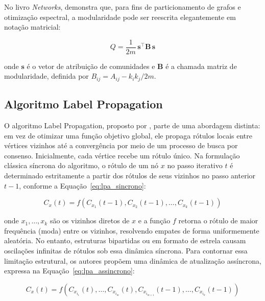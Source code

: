\documentclass[
      12pt,
      a4paper,
      openright,
      oneside,
      chapter=TITLE,
      section=TITLE,
      english,
      french,
      spanish,
      brazilian
    ]{abntex2}
\begin{document}
    No livro \textit{Networks},  demonstra que, para fins de particionamento de grafos e otimização espectral, a modularidade pode ser reescrita elegantemente em notação matricial:
    
    \begin{equation}
    Q = \frac{1}{2m}\, \mathbf{s}^{\top} \mathbf{B}\, \mathbf{s}
    \label{eq:mod_matricial}
    \end{equation}
    
    onde $\mathbf{s}$ é o vetor de atribuição de comunidades e $\mathbf{B}$ é a chamada matriz de modularidade, definida por $B_{ij} = A_{ij} - k_i k_j / 2m$.
    
    \subsection{Algoritmo Label Propagation}
    
    O algoritmo Label Propagation, proposto por , parte de uma abordagem distinta: em vez de otimizar uma função objetivo global, ele propaga rótulos locais entre vértices vizinhos até a convergência por meio de um processo de busca por consenso. Inicialmente, cada vértice recebe um rótulo único. Na formulação clássica síncrona do algoritmo, o rótulo de um nó $x$ no passo iterativo $t$ é determinado estritamente a partir dos rótulos de seus vizinhos no passo anterior $t-1$, conforme a Equação~\ref{eq:lpa_sincrono}:
    
    \begin{equation}
    C_x(t) = f\left( C_{x_1}(t-1), C_{x_2}(t-1), \dots, C_{x_k}(t-1) \right)
    \label{eq:lpa_sincrono}
    \end{equation}
    
    onde $x_1, \dots, x_k$ são os vizinhos diretos de $x$ e a função $f$ retorna o rótulo de maior frequência (moda) entre os vizinhos, resolvendo empates de forma uniformemente aleatória. No entanto, estruturas bipartidas ou em formato de estrela causam oscilações infinitas de rótulos sob essa dinâmica síncrona. Para contornar essa limitação estrutural, os autores propõem uma dinâmica de atualização assíncrona, expressa na Equação~\ref{eq:lpa_assincrono}:
    
    \begin{equation}
    C_x(t) = f\left( C_{x_{i_1}}(t), \dots, C_{x_{i_m}}(t), C_{x_{i_{m+1}}}(t-1), \dots, C_{x_{i_k}}(t-1) \right)
    \label{eq:lpa_assincrono}
    \end{equation}
    
\end{document}
